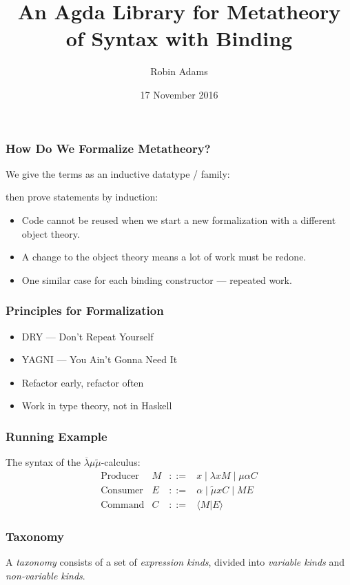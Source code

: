 \documentclass{beamer}
\title{An Agda Library for Metatheory of Syntax with Binding}
\author{Robin Adams}
\date{17 November 2016}
\begin{document}
\begin{frame}
\maketitle
\end{frame}

\begin{frame}
\frametitle{How Do We Formalize Metatheory?}
We give the terms as an inductive datatype / family:


then prove statements by induction:


\begin{itemize}
\item
Code cannot be reused when we start a new formalization with a different object theory.
\item
A change to the object theory means a lot of work must be redone.
\item
One similar case for each binding constructor --- repeated work.
\end{itemize}
\end{frame}

\begin{frame}
\frametitle{Principles for Formalization}
\begin{itemize}[<+->]
\item
DRY --- Don't Repeat Yourself
\item
YAGNI --- You Ain't Gonna Need It
\item
Refactor early, refactor often
\item
Work in type theory, not in Haskell
\end{itemize}
\end{frame}

\begin{frame}
\frametitle{Running Example}
The syntax of the $\overline{\lambda} \mu \tilde{\mu}$-calculus:
\[ \begin{array}{lrcl}
\text{Producer} & M & ::= & x \mid \lambda x M \mid \mu \alpha C \\
\text{Consumer} & E & ::= & \alpha \mid \tilde{\mu} x C \mid M E \\
\text{Command} & C & ::= & \langle M | E \rangle
\end{array} \]
\end{frame}

\begin{frame}
\frametitle{Taxonomy}
A \emph{taxonomy} consists of a set of \emph{expression kinds}, divided into \emph{variable kinds} and \emph{non-variable kinds}.

\end{frame}
\end{document}
